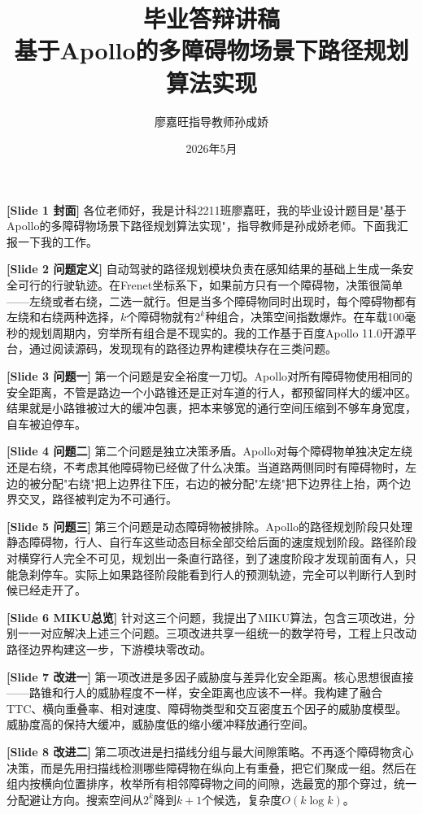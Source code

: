 \documentclass[a4paper,11pt]{ctexart}
\title{\textbf{毕业答辩讲稿}\\[0.4em]\large 基于Apollo的多障碍物场景下路径规划算法实现}
\author{廖嘉旺\quad{}指导教师\quad{}孙成娇}
\date{2026年5月}
\begin{document}
\maketitle
\thispagestyle{empty}

\bigskip

\textbf{[Slide 1 封面]}
各位老师好，我是计科2211班廖嘉旺，我的毕业设计题目是"基于Apollo的多障碍物场景下路径规划算法实现"，指导教师是孙成娇老师。下面我汇报一下我的工作。

\textbf{[Slide 2 问题定义]}
自动驾驶的路径规划模块负责在感知结果的基础上生成一条安全可行的行驶轨迹。在Frenet坐标系下，如果前方只有一个障碍物，决策很简单——左绕或者右绕，二选一就行。但是当多个障碍物同时出现时，每个障碍物都有左绕和右绕两种选择，$k$个障碍物就有$2^k$种组合，决策空间指数爆炸。在车载100毫秒的规划周期内，穷举所有组合是不现实的。我的工作基于百度Apollo 11.0开源平台，通过阅读源码，发现现有的路径边界构建模块存在三类问题。

\textbf{[Slide 3 问题一]}
第一个问题是安全裕度一刀切。Apollo对所有障碍物使用相同的安全距离，不管是路边一个小路锥还是正对车道的行人，都预留同样大的缓冲区。结果就是小路锥被过大的缓冲包裹，把本来够宽的通行空间压缩到不够车身宽度，自车被迫停车。

\textbf{[Slide 4 问题二]}
第二个问题是独立决策矛盾。Apollo对每个障碍物单独决定左绕还是右绕，不考虑其他障碍物已经做了什么决策。当道路两侧同时有障碍物时，左边的被分配"右绕"把上边界往下压，右边的被分配"左绕"把下边界往上抬，两个边界交叉，路径被判定为不可通行。

\textbf{[Slide 5 问题三]}
第三个问题是动态障碍物被排除。Apollo的路径规划阶段只处理静态障碍物，行人、自行车这些动态目标全部交给后面的速度规划阶段。路径阶段对横穿行人完全不可见，规划出一条直行路径，到了速度阶段才发现前面有人，只能急刹停车。实际上如果路径阶段能看到行人的预测轨迹，完全可以判断行人到时候已经走开了。

\textbf{[Slide 6 MIKU总览]}
针对这三个问题，我提出了MIKU算法，包含三项改进，分别一一对应解决上述三个问题。三项改进共享一组统一的数学符号，工程上只改动路径边界构建这一步，下游模块零改动。

\textbf{[Slide 7 改进一]}
第一项改进是多因子威胁度与差异化安全距离。核心思想很直接——路锥和行人的威胁程度不一样，安全距离也应该不一样。我构建了融合TTC、横向重叠率、相对速度、障碍物类型和交互密度五个因子的威胁度模型。威胁度高的保持大缓冲，威胁度低的缩小缓冲释放通行空间。

\textbf{[Slide 8 改进二]}
第二项改进是扫描线分组与最大间隙策略。不再逐个障碍物贪心决策，而是先用扫描线检测哪些障碍物在纵向上有重叠，把它们聚成一组。然后在组内按横向位置排序，枚举所有相邻障碍物之间的间隙，选最宽的那个穿过，统一分配避让方向。搜索空间从$2^k$降到$k+1$个候选，复杂度$O(k\log k)$。
\end{document}
